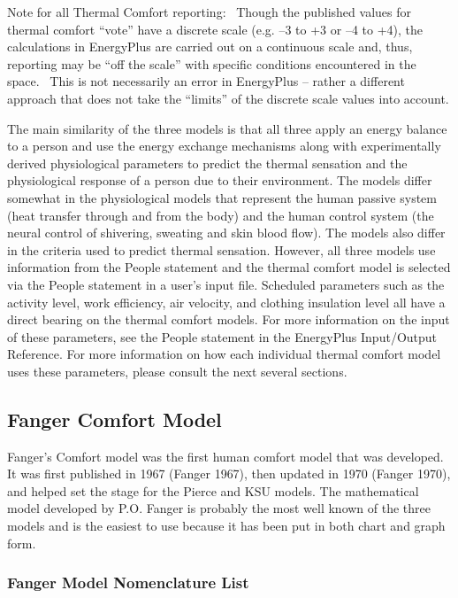 Note for all Thermal Comfort reporting:~ Though the published values for thermal comfort ``vote'' have a discrete scale (e.g. --3 to +3 or --4 to +4), the calculations in EnergyPlus are carried out on a continuous scale and, thus, reporting may be ``off the scale'' with specific conditions encountered in the space.~ This is not necessarily an error in EnergyPlus -- rather a different approach that does not take the ``limits'' of the discrete scale values into account.

The main similarity of the three models is that all three apply an energy balance to a person and use the energy exchange mechanisms along with experimentally derived physiological parameters to predict the thermal sensation and the physiological response of a person due to their environment. The models differ somewhat in the physiological models that represent the human passive system (heat transfer through and from the body) and the human control system (the neural control of shivering, sweating and skin blood flow). The models also differ in the criteria used to predict thermal sensation. However, all three models use information from the People statement and the thermal comfort model is selected via the People statement in a user's input file. Scheduled parameters such as the activity level, work efficiency, air velocity, and clothing insulation level all have a direct bearing on the thermal comfort models. For more information on the input of these parameters, see the People statement in the EnergyPlus Input/Output Reference. For more information on how each individual thermal comfort model uses these parameters, please consult the next several sections.

\subsection{Fanger Comfort Model}\label{fanger-comfort-model}

Fanger's Comfort model was the first human comfort model that was developed. It was first published in 1967 (Fanger 1967), then updated in 1970 (Fanger 1970), and helped set the stage for the Pierce and KSU models. The mathematical model developed by P.O. Fanger is probably the most well known of the three models and is the easiest to use because it has been put in both chart and graph form.

\subsubsection{Fanger Model Nomenclature List}\label{fanger-model-nomenclature-list}

